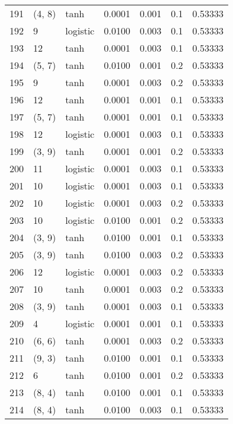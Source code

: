 \begin{tabular}{lllrrrr}
191 &      (4, 8) &      tanh &  0.0001 &  0.001 &  0.1 &   0.53333 \\
192 &           9 &  logistic &  0.0100 &  0.003 &  0.1 &   0.53333 \\
193 &          12 &      tanh &  0.0001 &  0.003 &  0.1 &   0.53333 \\
194 &      (5, 7) &      tanh &  0.0100 &  0.001 &  0.2 &   0.53333 \\
195 &           9 &      tanh &  0.0001 &  0.003 &  0.2 &   0.53333 \\
196 &          12 &      tanh &  0.0001 &  0.001 &  0.1 &   0.53333 \\
197 &      (5, 7) &      tanh &  0.0001 &  0.001 &  0.1 &   0.53333 \\
198 &          12 &  logistic &  0.0001 &  0.003 &  0.1 &   0.53333 \\
199 &      (3, 9) &      tanh &  0.0001 &  0.001 &  0.2 &   0.53333 \\
200 &          11 &  logistic &  0.0001 &  0.003 &  0.1 &   0.53333 \\
201 &          10 &  logistic &  0.0001 &  0.003 &  0.1 &   0.53333 \\
202 &          10 &  logistic &  0.0001 &  0.003 &  0.2 &   0.53333 \\
203 &          10 &  logistic &  0.0100 &  0.001 &  0.2 &   0.53333 \\
204 &      (3, 9) &      tanh &  0.0100 &  0.001 &  0.1 &   0.53333 \\
205 &      (3, 9) &      tanh &  0.0100 &  0.003 &  0.2 &   0.53333 \\
206 &          12 &  logistic &  0.0001 &  0.003 &  0.2 &   0.53333 \\
207 &          10 &      tanh &  0.0001 &  0.003 &  0.2 &   0.53333 \\
208 &      (3, 9) &      tanh &  0.0001 &  0.003 &  0.1 &   0.53333 \\
209 &           4 &  logistic &  0.0001 &  0.001 &  0.1 &   0.53333 \\
210 &      (6, 6) &      tanh &  0.0001 &  0.003 &  0.2 &   0.53333 \\
211 &      (9, 3) &      tanh &  0.0100 &  0.001 &  0.1 &   0.53333 \\
212 &           6 &      tanh &  0.0100 &  0.001 &  0.2 &   0.53333 \\
213 &      (8, 4) &      tanh &  0.0100 &  0.001 &  0.1 &   0.53333 \\
214 &      (8, 4) &      tanh &  0.0100 &  0.003 &  0.1 &   0.53333 \\

\end{tabular}
